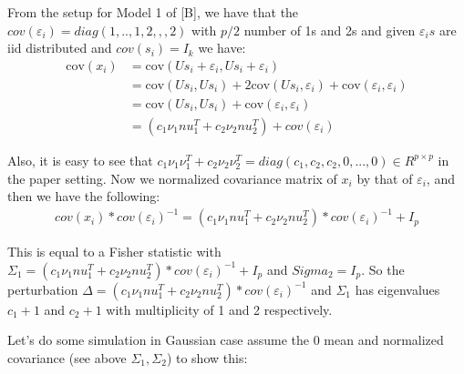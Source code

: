 \documentclass[
]{article}
\begin{document}
From the setup for Model 1 of {[}B{]}, we have that the
\(cov(\varepsilon_i) = diag(1,..,1, 2,,, 2)\) with \(p/2\) number of 1s
and 2s and given \(\varepsilon_i s\) are iid distributed and
\(cov(s_i) = I_k\) we have: \begin{align*}
\text{cov}(x_i) & = \text{cov}(U s_i + \varepsilon_i, U s_i + \varepsilon_i) \\& = \text{cov}(U s_i, U s_i) + 2\text{cov}(U s_i , \varepsilon_i) + \text{cov}(\varepsilon_i, \varepsilon_i) \\& = \text{cov}(U s_i, U s_i) + \text{cov}(\varepsilon_i, \varepsilon_i)\\& = (c_1\nu_1nu_1^T +  c_2\nu_2nu_2^T) + cov(\varepsilon_i)
\end{align*}

Also, it is easy to see that
\(c_1\nu_1 \nu_1^T + c_2\nu_2 \nu_2^T = diag(c_1, c_2, c_2, 0, ...,0) \in R^{p \times p}\)
in the paper setting. Now we normalized covariance matrix of \(x_i\) by
that of \(\varepsilon_i\), and then we have the following:
\begin{align*}
cov(x_i)*cov(\varepsilon_i)^{-1} = (c_1\nu_1nu_1^T +  c_2\nu_2nu_2^T)*cov(\varepsilon_i)^{-1} + I_p
\end{align*}

This is equal to a Fisher statistic with
\(\Sigma_1 = (c_1\nu_1nu_1^T + c_2\nu_2nu_2^T)*cov(\varepsilon_i)^{-1} + I_p\)
and \(Sigma_2 = I_p\). So the perturbation
\(\Delta = (c_1\nu_1nu_1^T + c_2\nu_2nu_2^T)*cov(\varepsilon_i)^{-1}\)
and \(\Sigma_1\) has eigenvalues \(c_1 + 1\) and \(c_2+1\) with
multiplicity of 1 and 2 respectively.

Let's do some simulation in Gaussian case assume the 0 mean and
normalized covariance (see above \(\Sigma_1, \Sigma_2\)) to show this:
\end{document}
